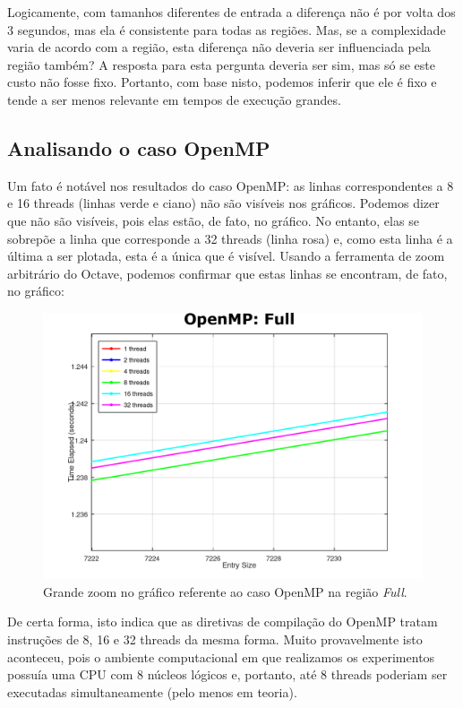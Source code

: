 \documentclass[a4paper, 12pt]{article}
\begin{document}
Logicamente, com tamanhos diferentes de entrada a diferença não é por volta dos 3 segundos, mas ela é consistente para todas as regiões. Mas, se a complexidade varia de acordo com a região, esta diferença não deveria ser influenciada pela região também? A resposta para esta pergunta deveria ser sim, mas só se este custo não fosse fixo. Portanto, com base nisto, podemos inferir que ele é fixo e tende a ser menos relevante em tempos de execução grandes.

\subsection{Analisando o caso OpenMP}

Um fato é notável nos resultados do caso OpenMP: as linhas correspondentes a 8 e 16 threads (linhas verde e ciano) não são visíveis nos gráficos. Podemos dizer que não são visíveis, pois elas estão, de fato, no gráfico. No entanto, elas se sobrepõe a linha que corresponde a 32 threads (linha rosa) e, como esta linha é a última a ser plotada, esta é a única que é visível. Usando a ferramenta de zoom arbitrário do Octave, podemos confirmar que estas linhas se encontram, de fato, no gráfico:

\begin{figure}[H]
	\centering
	\includegraphics[scale=0.45]{omp_example}
	\caption{Grande zoom no gráfico referente ao caso OpenMP na região \textit{Full}.}
\end{figure}

De certa forma, isto indica que as diretivas de compilação do OpenMP tratam instruções de 8, 16 e 32 threads da mesma forma. Muito provavelmente isto aconteceu, pois o ambiente computacional em que realizamos os experimentos possuía uma CPU com 8 núcleos lógicos e, portanto, até 8 threads poderiam ser executadas simultaneamente (pelo menos em teoria).\\
\end{document}
